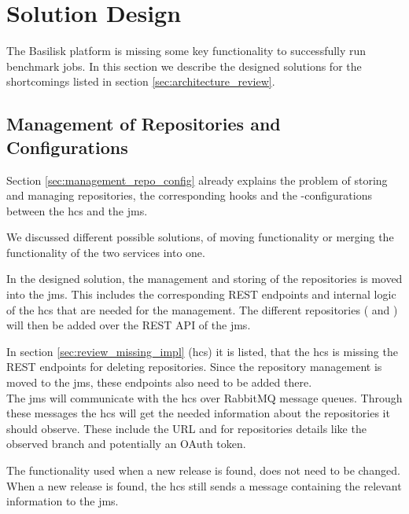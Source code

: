 \section{Solution Design}
\label{sec:solution_design}

The Basilisk platform is missing some key functionality to successfully run benchmark jobs.
In this section we describe the designed solutions for the shortcomings listed in section \ref{sec:architecture_review}.


\subsection{Management of Repositories and Configurations}
\label{sec:management_repo_config_design}
Section \ref{sec:management_repo_config} already explains the problem of storing and managing repositories, the corresponding hooks and the \ts{}-configurations between the \acf{hcs} and the \acf{jms}.

We discussed different possible solutions, of moving functionality or merging the functionality of the two services into one.

In the designed solution, the management and storing of the repositories is moved into the \ac{jms}.
This includes the corresponding REST endpoints and internal logic of the \ac{hcs} that are needed for the management.
The different repositories (\gh{} and \dockh{}) will then be added over the REST API of the \ac{jms}.

In section \ref{sec:review_missing_impl} (\acl{hcs}) it is listed, that the \ac{hcs} is missing the REST endpoints for deleting repositories.
Since the repository management is moved to the \ac{jms}, these endpoints also need to be added there.
\\

The \ac{jms} will communicate with the \ac{hcs} over RabbitMQ message queues.
Through these messages the \ac{hcs} will get the needed information about the repositories it should observe.
These include the URL and for \gh{} repositories details like the observed branch and potentially an OAuth token.

The functionality used when a new release is found, does not need to be changed.
When a new release is found, the \ac{hcs} still sends a message containing the relevant information to the \ac{jms}.
\\

